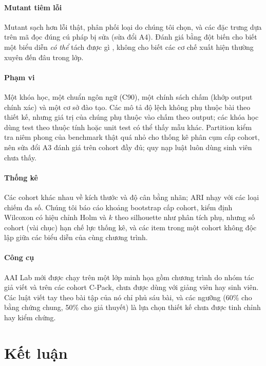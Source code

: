 \documentclass[a4paper,preprint,12pt,authoryear]{elsarticle}
\begin{document}
\paragraph{Mutant tiêm lỗi} Mutant sạch hơn lỗi thật, phân phối loại do chúng tôi chọn, và các đặc trưng dựa trên mã đọc đúng cú pháp bị sửa (sửa đổi A4). Đánh giá bằng đột biến cho biết một biểu diễn \emph{có thể} tách được gì \citep{just2014mutants}, không cho biết các cơ chế xuất hiện thường xuyên đến đâu trong lớp.

\paragraph{Phạm vi} Một khóa học, một chuẩn ngôn ngữ (C90), một chính sách chấm (khớp output chính xác) và một cơ sở đào tạo. Các mô tả độ lệch không phụ thuộc bài theo thiết kế, nhưng giá trị của chúng phụ thuộc vào chấm theo output; các khóa học dùng test theo thuộc tính hoặc unit test có thể thấy mẫu khác. Partition kiểm tra niêm phong của benchmark thật quá nhỏ cho thống kê phân cụm cấp cohort, nên sửa đổi A3 đánh giá trên cohort đầy đủ; quy nạp luật luôn dùng sinh viên chưa thấy.

\paragraph{Thống kê} Các cohort khác nhau về kích thước và độ cân bằng nhãn; ARI nhạy với các loại chiếm đa số. Chúng tôi báo cáo khoảng bootstrap cấp cohort, kiểm định Wilcoxon có hiệu chỉnh Holm và $k$ theo silhouette như phân tích phụ, nhưng số cohort (vài chục) hạn chế lực thống kê, và các item trong một cohort không độc lập giữa các biểu diễn của cùng chương trình.

\paragraph{Công cụ} AAI Lab mới được chạy trên một lớp minh họa gồm chương trình do nhóm tác giả viết và trên các cohort C-Pack, chưa được dùng với giảng viên hay sinh viên. Các luật viết tay theo bài tập của nó chỉ phủ sáu bài, và các ngưỡng (60\% cho bằng chứng chung, 50\% cho giả thuyết) là lựa chọn thiết kế chưa được tinh chỉnh hay kiểm chứng.


\section{Kết luận}\label{sec:conclusion}
\end{document}
